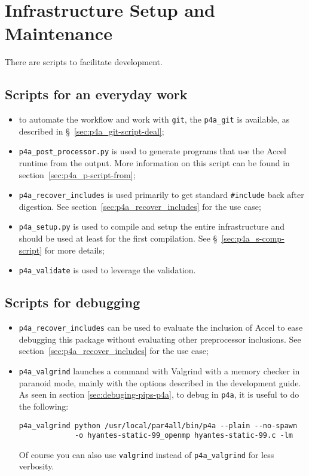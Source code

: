 \documentclass[a4paper]{article}
\begin{document}
\section{Infrastructure Setup and Maintenance}
\label{sec:setup}

There are scripts to facilitate development.

\subsection{Scripts for an everyday work}
\label{sec:an-everyday-work}

\begin{itemize}
\item to automate the \Apfa workflow and work with \texttt{git}, the
  \verb|p4a_git| is available, as described in
  \S~\ref{sec:p4a_git-script-deal};
\item \verb|p4a_post_processor.py| is used to generate programs that use
  the \Apfa Accel runtime from the \Apips output. More information on
  this script can be found in section~\ref{sec:p4a_p-script-from};
\item \verb|p4a_recover_includes| is used primarily to get standard
  \verb|#include| back after \Apips digestion. See
  section~\ref{sec:p4a_recover_includes} for the use case;
\item \verb|p4a_setup.py| is used to compile and setup the entire \Apfa
  infrastructure and should be used at least for the first
  compilation. See \S~\ref{sec:p4a_s-comp-script} for more details;
\item \verb|p4a_validate| is used to leverage the \Apips validation.
\end{itemize}


\subsection{Scripts for debugging}
\label{sec:scripts-debugging}

\begin{itemize}
\item \verb|p4a_recover_includes| can be used to evaluate the inclusion of
  \Apfa Accel to ease debugging this package without evaluating other
  preprocessor inclusions. See section~\ref{sec:p4a_recover_includes} for
  the use case;
\item \verb|p4a_valgrind| launches a command with Valgrind with a memory
  checker in paranoid mode, mainly with the options described in the
  \Apips development guide. As seen in section
  \ref{sec:debuging-pips-p4a}, to debug \Apips in \texttt{p4a}, it is
  useful to do the following:
\begin{verbatim}
p4a_valgrind python /usr/local/par4all/bin/p4a --plain --no-spawn
             -o hyantes-static-99_openmp hyantes-static-99.c -lm
\end{verbatim}
  Of course you can also use \texttt{valgrind} instead of
  \verb/p4a_valgrind/ for less verbosity.
\end{itemize}
\end{document}
